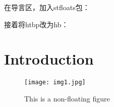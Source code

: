
在导言区，加入stfloats包：
\usepackage{stfloats}

接着将htbp改为hb：
\section{Introduction}
\begin{figure*}[hb]
\centering
\texttt{[image: img1.jpg]}
\caption{This is a non-floating figure}
\label{fig_framework}
\end{figure*}
